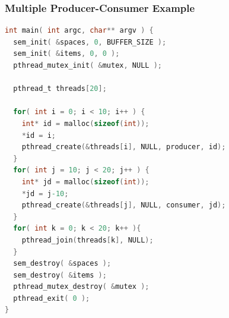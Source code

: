 \begin{frame}[fragile]
	\frametitle{Multiple Producer-Consumer Example}
	\begin{lstlisting}[language=C]
int main( int argc, char** argv ) {
  sem_init( &spaces, 0, BUFFER_SIZE );
  sem_init( &items, 0, 0 );  
  pthread_mutex_init( &mutex, NULL );

  pthread_t threads[20];

  for( int i = 0; i < 10; i++ ) {
    int* id = malloc(sizeof(int));
    *id = i;
    pthread_create(&threads[i], NULL, producer, id);
  }
  for( int j = 10; j < 20; j++ ) {
    int* jd = malloc(sizeof(int));
    *jd = j-10;
    pthread_create(&threads[j], NULL, consumer, jd);
  }
  for( int k = 0; k < 20; k++ ){  
    pthread_join(threads[k], NULL);
  }
  sem_destroy( &spaces );
  sem_destroy( &items );
  pthread_mutex_destroy( &mutex );
  pthread_exit( 0 );
}
\end{lstlisting}
\end{frame}





